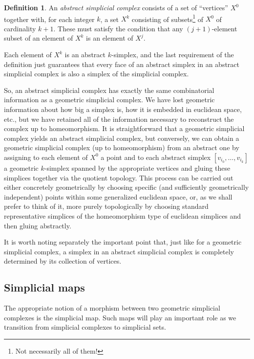 \documentclass[12pt]{article}
\theoremstyle{plain}
\theoremstyle{definition}
\newtheorem{definition}[theorem]{Definition}
\begin{document}
\begin{definition}
An \emph{abstract simplicial complex} consists of a set of ``vertices'' $X^0$ together with, for each integer $k$, a set $X^k$ consisting of subsets\footnote{Not necessarily all of them!} of $X^0$ of cardinality $k+1$. These must satisfy the condition that any $(j+1)$-element subset of an element of $X^k$ is an element of $X^j$. 
\end{definition}

Each element of $X^k$ is an abstract $k$-simplex, and 
the last requirement of the definition just guarantees that every face of an abstract simplex in an abstract simplicial complex is also a simplex of the simplicial complex. 

So, an abstract simplicial complex has exactly the same combinatorial information as a geometric simplicial complex. We have lost geometric information about how big a simplex is, how it is embedded in euclidean space, etc., but we have retained all of the information necessary to reconstruct the complex up to homeomorphism.
 It is straightforward that a geometric simplicial complex yields an abstract simplicial complex, but conversely, we can obtain a geometric simplicial complex (up to homeomorphism) from an abstract one by assigning to each element of $X^0$ a point  and to each  abstract simplex $[v_{i_0},\ldots, v_{i_k}]$ a geometric $k$-simplex spanned by the appropriate vertices and gluing these simplices together via the quotient topology. This process can be carried out either concretely geometrically by choosing specific (and sufficiently geometrically independent) points within some generalized euclidean space, or, as we shall prefer to think of it,  more purely topologically by choosing standard representative simplices of the homeomorphism type of euclidean simplices and then gluing abstractly. 
 
It is worth noting separately the important point that, just like for a geometric simplicial complex, a simplex in an abstract simplicial complex is completely determined by its collection of vertices.





\subsection{Simplicial maps}

The appropriate notion of a morphism between two geometric simplicial complexes  is the simplicial map. Such maps will play an important role as we transition  from simplicial complexes to simplicial sets. 
\end{document}
